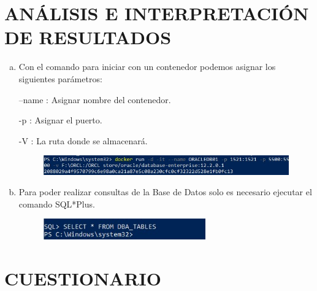 \documentclass[preprint,12pt]{elsarticle}
\begin{document}
\section{ANÁLISIS E INTERPRETACIÓN DE RESULTADOS}
\begin{enumerate}[a)]
\item Con el comando para iniciar con un contenedor podemos asignar los siguientes parámetros:
\begin{center} --name : Asignar nombre del contenedor.\end{center}
\begin{center} -p : 	Asignar el puerto.\end{center}
\begin{center} -V : La ruta donde se almacenará.\end{center}
\begin{figure}[htb]
	\begin{center}
		\includegraphics[width=12cm]{./IMAGENES/Docker8_17}
	\end{center}
\end{figure}

\item Para poder realizar consultas de la Base de Datos solo es necesario ejecutar el comando SQL*Plus.
\begin{figure}[htb]
	\begin{center}
		\includegraphics[width=7cm]{./IMAGENES/Docker8_12}
	\end{center}
\end{figure}
\end{enumerate}


\section{CUESTIONARIO}
\end{document}
